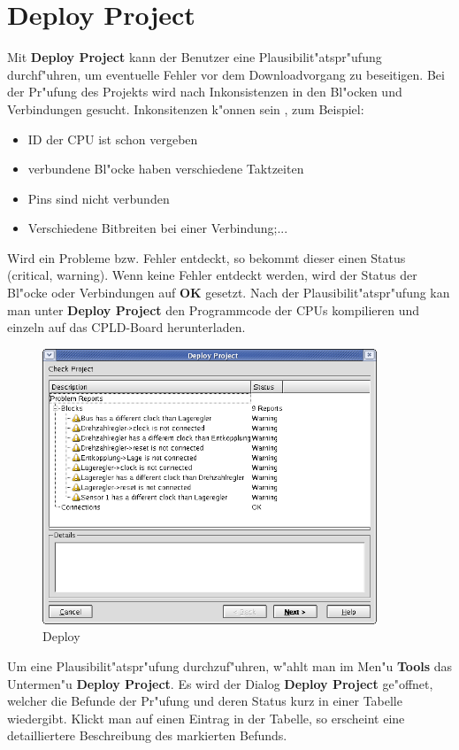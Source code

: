 \documentclass[a4paper,titlepage,12pt,ngerman]{scrbook}
\begin{document}
\section{Deploy Project}
Mit {\bf Deploy Project} kann der Benutzer eine Plausibilit"atspr"ufung durchf"uhren, um eventuelle Fehler vor dem Downloadvorgang zu beseitigen. Bei der Pr"ufung des Projekts wird nach Inkonsistenzen in den Bl"ocken und Verbindungen gesucht. Inkonsitenzen k"onnen sein , zum Beispiel:
\begin{itemize}
\item ID der CPU ist schon vergeben
\item verbundene Bl"ocke haben verschiedene Taktzeiten
\item Pins sind nicht verbunden
\item Verschiedene Bitbreiten bei einer Verbindung;...
\end{itemize}
Wird ein Probleme bzw. Fehler entdeckt, so bekommt dieser einen Status (critical, warning). Wenn keine Fehler entdeckt werden, wird der Status der Bl"ocke oder Verbindungen auf {\bf OK} gesetzt.\newline
Nach der Plausibilit"atspr"ufung kan man unter {\bf Deploy Project} den Programmcode der CPUs kompilieren und einzeln auf das CPLD-Board herunterladen.
\begin{figure}[htbp]

\begin{center}

\includegraphics[width=10cm]{Deploy}

\caption{Deploy}\label{test}

\end{center}
\end{figure}
Um eine Plausibilit"atspr"ufung durchzuf"uhren, w"ahlt man im Men"u {\bf Tools} das Untermen"u {\bf Deploy Project}. Es wird der Dialog {\bf Deploy Project} ge"offnet, welcher die Befunde der Pr"ufung und deren Status kurz in einer Tabelle wiedergibt. Klickt man auf einen Eintrag in der Tabelle, so erscheint eine detailliertere Beschreibung des markierten Befunds.\par
\end{document}
